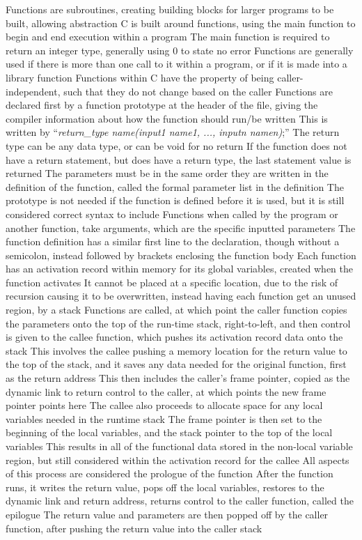 \documentclass[11 pt, twoside]{article}
\newenvironment{outline*}
{
	\begin{outline}[enumerate]
	}
	{\end{outline}
}
\begin{document}
\begin{outline*}
\1 Functions are subroutines, creating building blocks for larger programs to be built, allowing abstraction
\2 C is built around functions, using the main function to begin and end execution within a program
\3 The main function is required to return an integer type, generally using 0 to state no error
\2 Functions are generally used if there is more than one call to it within a program, or if it is made into a library function
\2 Functions within C have the property of being caller-independent, such that they do not change based on the caller
\1 Functions are declared first by a function prototype at the header of the file, giving the compiler information about how the function should run/be written
\2 This is written by ``\textit{return\_type name(input1 name1, ..., inputn namen)};''
\3 The return type can be any data type, or can be void for no return
\3 If the function does not have a return statement, but does have a return type, the last statement value is returned
\3 The parameters must be in the same order they are written in the definition of the function, called the formal parameter list in the definition
\3 The prototype is not needed if the function is defined before it is used, but it is still considered correct syntax to include
\2 Functions when called by the program or another function, take arguments, which are the specific inputted parameters
\2 The function definition has a similar first line to the declaration, though without a semicolon, instead followed by brackets enclosing the function body
\1 Each function has an activation record within memory for its global variables, created when the function activates
\2 It cannot be placed at a specific location, due to the risk of recursion causing it to be overwritten, instead having each function get an unused region, by a stack
\1 Functions are called, at which point the caller function copies the parameters onto the top of the run-time stack, right-to-left, and then control is given to the callee function, which pushes its activation record data onto the stack
\2 This involves the callee pushing a memory location for the return value to the top of the stack, and it saves any data needed for the original function, first as the return address
\3 This then includes the caller's frame pointer, copied as the dynamic link to return control to the caller, at which points the new frame pointer points here
\2 The callee also proceeds to allocate space for any local variables needed in the runtime stack
\2 The frame pointer is then set to the beginning of the local variables, and the stack pointer to the top of the local variables
\3 This results in all of the functional data stored in the non-local variable region, but still considered within the activation record for the callee
\2 All aspects of this process are considered the prologue of the function
\2 After the function runs, it writes the return value, pops off the local variables, restores to the dynamic link and return address, returns control to the caller function, called the epilogue
\3 The return value and parameters are then popped off by the caller function, after pushing the return value into the caller stack
\end{outline*}
\end{document}
